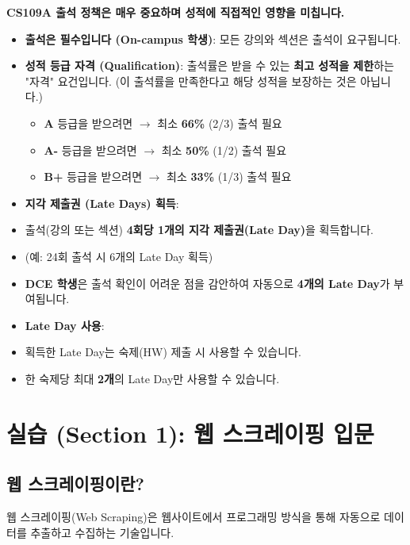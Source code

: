 \documentclass[11pt,a4paper]{book}
\theoremstyle{definition}
\begin{document}
\begin{warningbox}
\textbf{CS109A 출석 정책은 매우 중요하며 성적에 직접적인 영향을 미칩니다.}

\begin{itemize}
    \item \textbf{출석은 필수입니다 (On-campus 학생)}: 모든 강의와 섹션은 출석이 요구됩니다.
    \item \textbf{성적 등급 자격 (Qualification)}: 출석률은 받을 수 있는 \textbf{최고 성적을 제한}하는 "자격" 요건입니다. (이 출석률을 만족한다고 해당 성적을 보장하는 것은 아닙니다.)
        \begin{itemize}
            \item \textbf{A} 등급을 받으려면 $\rightarrow$ 최소 \textbf{66\%} (2/3) 출석 필요
            \item \textbf{A-} 등급을 받으려면 $\rightarrow$ 최소 \textbf{50\%} (1/2) 출석 필요
            \item \textbf{B+} 등급을 받으려면 $\rightarrow$ 최소 \textbf{33\%} (1/3) 출석 필요
        \end{itemize}
    \item \textbf{지각 제출권 (Late Days) 획득}:
        \item 출석(강의 또는 섹션) \textbf{4회당 1개의 지각 제출권(Late Day)}을 획득합니다.
        \item (예: 24회 출석 시 6개의 Late Day 획득)
        \item \textbf{DCE 학생}은 출석 확인이 어려운 점을 감안하여 자동으로 \textbf{4개의 Late Day}가 부여됩니다.
    \item \textbf{Late Day 사용}:
        \item 획득한 Late Day는 숙제(HW) 제출 시 사용할 수 있습니다.
        \item 한 숙제당 최대 \textbf{2개}의 Late Day만 사용할 수 있습니다.
\end{itemize}
\end{warningbox}


\section{실습 (Section 1): 웹 스크레이핑 입문}

\subsection{웹 스크레이핑이란?}
웹 스크레이핑(Web Scraping)은 웹사이트에서 프로그래밍 방식을 통해 자동으로 데이터를 추출하고 수집하는 기술입니다.
\end{document}
